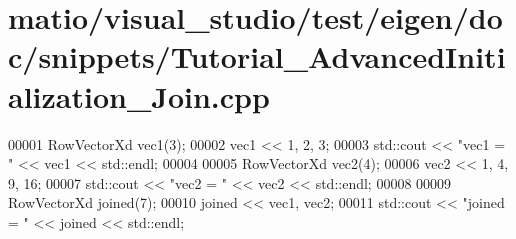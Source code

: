 \hypertarget{matio_2visual__studio_2test_2eigen_2doc_2snippets_2_tutorial___advanced_initialization___join_8cpp_source}{}\section{matio/visual\+\_\+studio/test/eigen/doc/snippets/\+Tutorial\+\_\+\+Advanced\+Initialization\+\_\+\+Join.cpp}
\label{matio_2visual__studio_2test_2eigen_2doc_2snippets_2_tutorial___advanced_initialization___join_8cpp_source}

\begin{DoxyCode}
00001 RowVectorXd vec1(3);
00002 vec1 << 1, 2, 3;
00003 std::cout << \textcolor{stringliteral}{"vec1 = "} << vec1 << std::endl;
00004 
00005 RowVectorXd vec2(4);
00006 vec2 << 1, 4, 9, 16;
00007 std::cout << \textcolor{stringliteral}{"vec2 = "} << vec2 << std::endl;
00008 
00009 RowVectorXd joined(7);
00010 joined << vec1, vec2;
00011 std::cout << \textcolor{stringliteral}{"joined = "} << joined << std::endl;
\end{DoxyCode}
